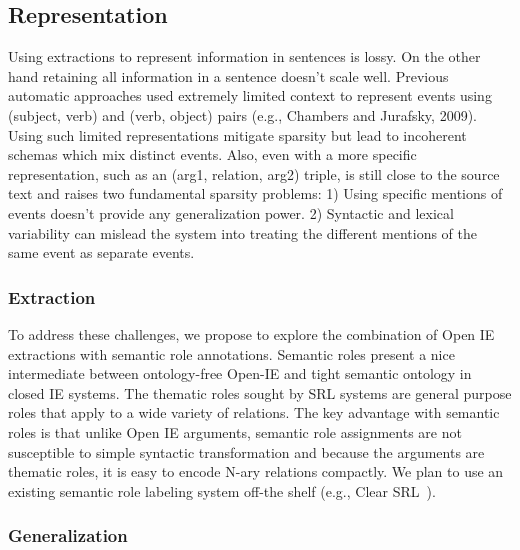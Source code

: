 \subsection{Representation}
Using extractions to represent information in sentences is lossy. On the other hand retaining all information in a sentence doesn't scale well. Previous automatic approaches used extremely limited context to represent events using (subject, verb) and (verb, object) pairs (e.g., Chambers and Jurafsky, 2009). Using such limited representations mitigate sparsity but lead to incoherent schemas which mix distinct events. Also, even with a more specific representation, such as an (arg1, relation, arg2) triple, is still close to the source text and raises two fundamental sparsity problems: 1) Using specific mentions of events doesn't provide any generalization power. 2) Syntactic and lexical variability can mislead the system into treating the different mentions of the same event as separate events. 

\subsubsection{Extraction}

To address these challenges, we propose to explore the combination of Open IE extractions with semantic role annotations. Semantic roles present a nice intermediate between ontology-free Open-IE and tight semantic ontology in closed IE systems. The thematic roles sought by SRL systems are general purpose roles that apply to a wide variety of relations. The key advantage with semantic roles is that unlike Open IE arguments, semantic role assignments are not susceptible to simple syntactic transformation and because the arguments are thematic roles, it is easy to encode N-ary relations compactly. We plan to use an existing semantic role labeling system off-the shelf (e.g., Clear SRL~\cite{punyakanok2008importance}).

\subsubsection{Generalization}

